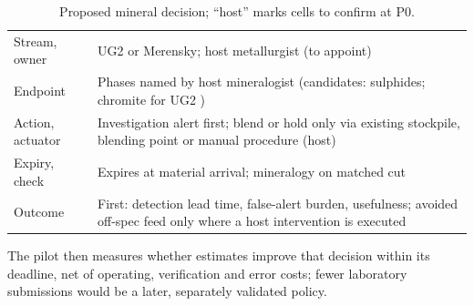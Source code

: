 \documentclass[10pt,a4paper,twocolumn]{article}
\begin{document}
\begin{table}[t]
\centering\footnotesize
\caption{Proposed mineral decision; ``host'' marks cells to confirm at P0.}
\label{tab:decision}
\begin{tabularx}{\columnwidth}{@{}L{1.7cm}Y@{}}
\toprule
Stream, owner & UG2 or Merensky; host metallurgist (to appoint) \\
Endpoint & Phases named by host mineralogist (candidates: sulphides; chromite for UG2 \cite{jones2005}) \\
Action, actuator & Investigation alert first; blend or hold only via existing stockpile, blending point or manual procedure (host) \\
Expiry, check & Expires at material arrival; mineralogy on matched cut \\
Outcome & First: detection lead time, false-alert burden, usefulness; avoided off-spec feed only where a host intervention is executed \\
\bottomrule
\end{tabularx}
\end{table}

 The pilot then measures whether estimates improve that decision within its deadline, net of operating, verification and error costs; fewer laboratory submissions would be a later, separately validated policy.
\end{document}
